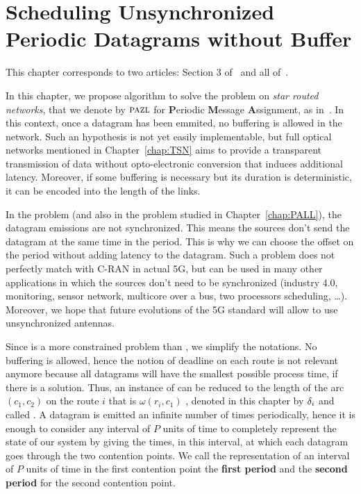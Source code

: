 
\chapter{Scheduling Unsynchronized Periodic Datagrams without Buffer}
\label{chap:PAZL}
\minitoc


This chapter corresponds to two articles: Section $3$ of~\cite{DBLP:conf/ict/BarthGLMS18} and all of~\cite{DBLP:journals/corr/abs-2002-07606}.


 In this chapter, we propose algorithm to solve the problem \pazl on \emph{star routed networks}, that we denote by $\textsc{pazl}$ for \textbf{P}eriodic \textbf{M}essage \textbf{A}ssignment, as in~\cite{DBLP:journals/corr/abs-2002-07606}.
 In this context, once a datagram has been emmited, no buffering is allowed in the network. Such an hypothesis is not yet easily implementable, but full optical networks mentioned in Chapter~\ref{chap:TSN} aims to provide a transparent transmission of data without opto-electronic conversion that induces additional latency. 
 Moreover, if some buffering is necessary but its duration is deterministic, it can be encoded into the length of the links.

 In the problem \pma (and also in the problem \pall studied in Chapter~\ref{chap:PALL}), the datagram emissions are not synchronized. This means the sources don't send the datagram at the same time in the period. This is why we can choose the offset on the period without adding latency to the datagram. Such a problem does not perfectly match with C-RAN in actual 5G, but can be used in many other applications in which the sources don't need to be synchronized (industry 4.0, monitoring, sensor network, multicore over a bus, two processors scheduling, \dots).  Moreover, we hope that future evolutions of the 5G standard will allow to use unsynchronized antennas.

 Since \pma is a more constrained problem than \pall, we simplify the notations. No buffering is allowed, hence the notion of deadline on each route is not relevant anymore because all datagrams will have the smallest possible process time, if there is a solution. Thus, an instance of \pma can be reduced to the length of the arc $(c_1,c_2)$ on the route $i$ that is $\omega(r_i,c_1)$ , denoted in this chapter by $\delta_i$ and called \nomdelay. A datagram is emitted an infinite number of times periodically, hence it is enough to consider any interval of $P$ units of time to completely represent the state of our system by giving the times, in this interval, at which each datagram goes through the two contention points. We call the representation of an interval of $P$ units of time in the first contention point the \textbf{first period} and the \textbf{second period} for the second contention point. 

